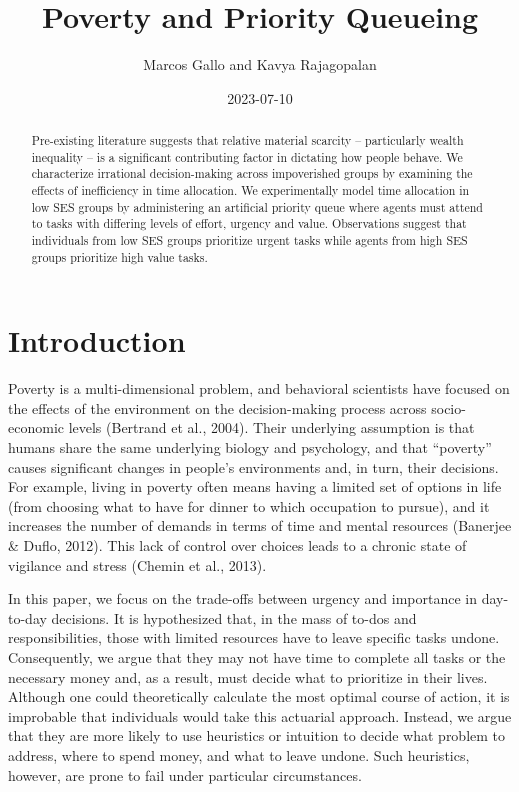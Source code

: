 \documentclass[
]{report}
\title{Poverty and Priority Queueing}
\author{Marcos Gallo and Kavya Rajagopalan}
\date{2023-07-10}
\renewcommand*\contentsname{Table of contents}
\newcommand\contentsname{Table of contents}
\begin{document}
\maketitle
\begin{abstract}
Pre-existing literature suggests that relative material scarcity --
particularly wealth inequality -- is a significant contributing factor
in dictating how people behave. We characterize irrational
decision-making across impoverished groups by examining the effects of
inefficiency in time allocation. We experimentally model time allocation
in low SES groups by administering an artificial priority queue where
agents must attend to tasks with differing levels of effort, urgency and
value. Observations suggest that individuals from low SES groups
prioritize urgent tasks while agents from high SES groups prioritize
high value tasks.
\end{abstract}
\ifdefined\Shaded\renewenvironment{Shaded}{\begin{tcolorbox}[interior hidden, borderline west={3pt}{0pt}{shadecolor}, enhanced, boxrule=0pt, breakable, frame hidden, sharp corners]}{\end{tcolorbox}}\fi

\renewcommand*\contentsname{Table of contents}
{
\hypersetup{linkcolor=}
\setcounter{tocdepth}{2}
\tableofcontents
}
\hypertarget{introduction}{%
\chapter{Introduction}\label{introduction}}

Poverty is a multi-dimensional problem, and behavioral scientists have
focused on the effects of the environment on the decision-making process
across socio-economic levels (Bertrand et al., 2004). Their underlying
assumption is that humans share the same underlying biology and
psychology, and that ``poverty'' causes significant changes in people's
environments and, in turn, their decisions. For example, living in
poverty often means having a limited set of options in life (from
choosing what to have for dinner to which occupation to pursue), and it
increases the number of demands in terms of time and mental resources
(Banerjee \& Duflo, 2012). This lack of control over choices leads to a
chronic state of vigilance and stress (Chemin et al., 2013).

In this paper, we focus on the trade-offs between urgency and importance
in day-to-day decisions. It is hypothesized that, in the mass of to-dos
and responsibilities, those with limited resources have to leave
specific tasks undone. Consequently, we argue that they may not have
time to complete all tasks or the necessary money and, as a result, must
decide what to prioritize in their lives. Although one could
theoretically calculate the most optimal course of action, it is
improbable that individuals would take this actuarial approach. Instead,
we argue that they are more likely to use heuristics or intuition to
decide what problem to address, where to spend money, and what to leave
undone. Such heuristics, however, are prone to fail under particular
circumstances.
\end{document}
